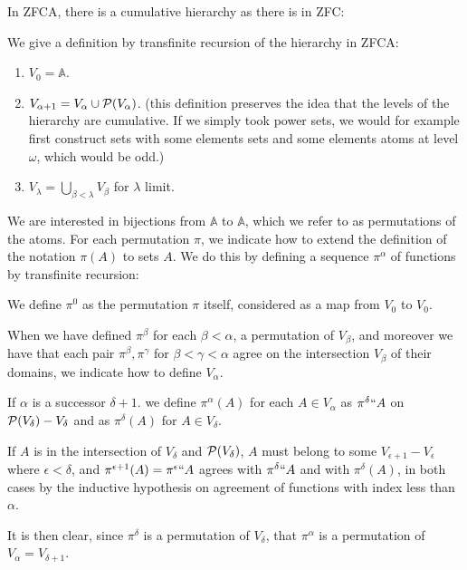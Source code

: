 \documentclass[12pt]{book}
\begin{document}
In ZFCA, there is a cumulative hierarchy as there is in ZFC:

We give a definition by transfinite recursion of the hierarchy in ZFCA:

\begin{enumerate}

\item $V_0 = \mathbb A$.

\item $V_{\alpha+1} = V_{\alpha} \cup {\cal P}(V_{\alpha})$.  (this definition preserves the idea that the levels of the hierarchy are cumulative.  If we simply took power sets, we would for example first construct sets with some elements sets and some elements atoms at level $\omega$, which would be odd.)

\item $V_{\lambda} = \bigcup_{\beta<\lambda}V_{\beta}$ for $\lambda$ limit.

\end{enumerate}

We are interested in bijections from $\mathbb A$ to $\mathbb A$, which we refer to as permutations of the atoms.  For each permutation $\pi$, we indicate how to extend the definition of the notation $\pi(A)$ to sets $A$.   We do this by defining a sequence $\pi^{\alpha}$ of functions by transfinite recursion:

We define $\pi^0$ as the permutation $\pi$ itself, considered as a map from $V_0$ to $V_0$.

When we have defined $\pi^{\beta}$ for each $\beta<\alpha$, a permutation of $V_{\beta}$, and moreover we have that each pair $\pi^{\beta}, \pi^{\gamma}$ for $\beta<\gamma<\alpha$ agree on the intersection $V_{\beta}$ of their domains, we indicate how to define $V_{\alpha}$.

If $\alpha$ is a successor $\delta+1$. we define $\pi^{\alpha}(A)$ for each $A \in V_{\alpha}$ as $\pi^{\delta}``A$ on ${\cal P}(V_{\delta})-V_{\delta}$ and as $\pi^{\delta}(A)$ for $A \in V_{\delta}$.   

If $A$ is in the intersection of $V_{\delta}$ and ${\cal P}(V_{\delta})$, $A$ must belong to some $V_{\epsilon+1}-V_{\epsilon}$ where $\epsilon<\delta$, and $\pi^{\epsilon+1}(A) = \pi^{\epsilon}``A$ agrees with $\pi^{\delta}``A$ and with $\pi^{\delta}(A)$, in both cases by the inductive hypothesis on agreement of functions with index less than $\alpha$.

 It is then clear, since $\pi^{\delta}$ is a permutation of $V_{\delta}$,
that $\pi^{\alpha}$ is a permutation of $V_{\alpha} = V_{\delta+1}$.  
\end{document}

